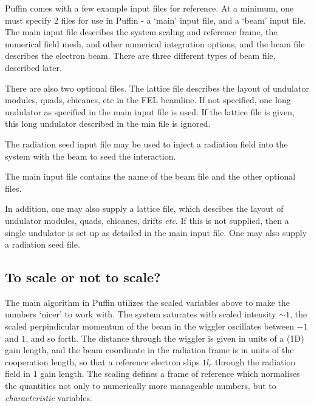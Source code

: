 \documentclass[12pt]{article}%
\begin{document}
Puffin comes with a few example input files for reference. At a minimum, one must specify 2 files for use in Puffin - a `main' input file, and a `beam' input file. The main input file describes the system scaling and reference frame, the numerical field mesh, and other numerical integration options, and the beam file describes the electron beam. There are three different types of beam file, described later.

There are also two optional files. The lattice file describes the layout of undulator modules, quads, chicanes, etc in the FEL beamline. If not specified, one long undulator as specified in the main input file is used. If the lattice file is given, this long undulator described in the min file is ignored.

The radiation seed input file may be used to inject a radiation field into the system with the beam to seed the interaction.

The main input file contains the name of the beam file and the other optional files.





In addition, one may also supply a lattice file, which descibes the layout of undulator modules, quads, chicanes, drifts \textit{etc}. If this is not supplied, then a single undulator is set up as detailed in the main input file. One may also supply a radiation seed file.

\subsection{To scale or not to scale?}

The main algorithm in Puffin utilizes the scaled variables above to make the numbers `nicer' to work with. The system saturates with scaled intensity $\sim 1$, the scaled perpindicular momentum of the beam in the wiggler oscillates between $-1$ and $1$, and so forth. The distance through the wiggler is given in units of a (1D) gain length, and the beam coordinate in the radiation frame is in units of the cooperation length, so that a reference electron slips $1l_c$ through the radiation field in $1$ gain  length. The scaling defines a frame of reference which normalises the quantities not only to numerically more manageable numbers, but to \textit{characteristic} variables. 
\end{document}
